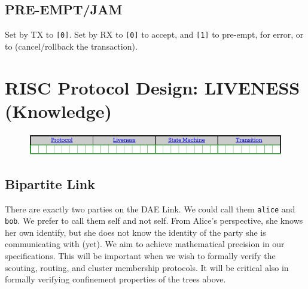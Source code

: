 \documentclass[../HFT-main.tex]{subfiles}
\begin{document}
\subsection{PRE-EMPT/JAM}


\nopagebreak[2]Set by TX to \texttt{[0]}. Set by RX to \texttt{[0]} to accept, and  \texttt{[1]} to pre-empt, for error, or to (cancel/rollback the transaction).

 \clearpage
 \section{RISC Protocol Design: LIVENESS (Knowledge)}

\begin{fullwidth}
 \begin{figure}
 
\includegraphics[width=1.6\linewidth]{../figures/First-Slice-Encodings.pdf}
\end{figure}
\end{fullwidth}


%


\subsection{Bipartite Link}

There are exactly two parties on the DAE Link. We could call them \texttt{alice} and \texttt{bob}. We prefer to call them self and not self. From Alice’s perspective, she knows her own identify, but she does not know the identity of the party she is communicating with (yet). We aim to achieve mathematical precision in our specifications. This will be important when we wish to formally verify the scouting, routing, and cluster membership protocols. It will be critical also in formally verifying confinement properties of the trees above.
\end{document}

